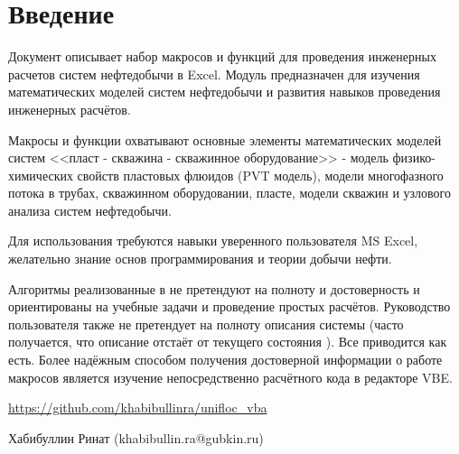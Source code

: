 \chapter*{Введение}                         %

Документ описывает набор макросов и функций \unf{} для проведения инженерных расчетов систем нефтедобычи в Excel. Модуль предназначен для изучения математических моделей систем нефтедобычи и развития навыков проведения инженерных расчётов.

Макросы и функции \unf{} охватывают основные элементы математических моделей систем <<пласт - скважина - скважинное оборудование>> - модель физико-химических свойств пластовых флюидов (PVT модель), модели многофазного потока в трубах, скважинном оборудовании, пласте, модели скважин и узлового анализа систем нефтедобычи.  

Для использования \unf{} требуются навыки уверенного пользователя MS Excel, желательно знание основ программирования и теории добычи нефти. 

Алгоритмы реализованные в  \unf{} не претендуют на полноту и достоверность и ориентированы на учебные задачи и проведение простых расчётов. Руководство пользователя также не претендует на полноту описания системы (часто получается, что описание отстаёт от текущего состояния \unf{}). Все приводится как есть. Более надёжным способом получения достоверной информации о работе макросов \unf{} является изучение непосредственно расчётного кода в редакторе VBE.


\url{https://github.com/khabibullinra/unifloc_vba}

Хабибуллин Ринат (khabibullin.ra@gubkin.ru)  